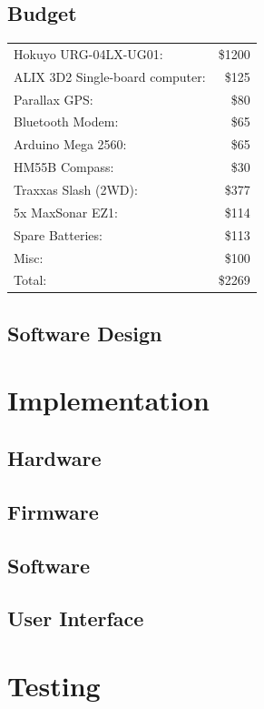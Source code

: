 \documentclass[a4paper,12pt]{article}
\begin{document}
\subsection{Budget}
\begin{tabular}{lr}
Hokuyo URG-04LX-UG01: & \$1200 \\
ALIX 3D2 Single-board computer: & \$125 \\
Parallax GPS: & \$80 \\
Bluetooth Modem: & \$65 \\ 
Arduino Mega 2560: & \$65 \\ 
HM55B Compass: & \$30 \\ 
Traxxas Slash (2WD): & \$377 \\ 
5x MaxSonar EZ1: & \$114 \\
Spare Batteries: & \$113 \\
Misc: & ~\$100 \\
\hline
Total: & \$2269
\end{tabular}

\subsection{Software Design}


\section{Implementation}
\subsection{Hardware}


\subsection{Firmware}


\subsection{Software}


\subsection{User Interface}


\section{Testing}

\end{document}
